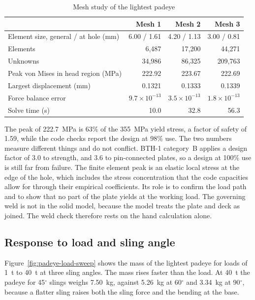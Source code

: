 \begin{table}[H]
\centering
\caption{Mesh study of the lightest padeye}
\label{tab:padeye-fea}
\small
\begin{tabular}{lrrr}
\toprule
& \textbf{Mesh 1} & \textbf{Mesh 2} & \textbf{Mesh 3}\\
\midrule
Element size, general / at hole (mm) & 6.00 / 1.61 & 4.20 / 1.13 & 3.00 / 0.81\\
Elements & 6,487 & 17,200 & 44,271\\
Unknowns & 34,986 & 86,325 & 209,763\\
Peak von Mises in head region (MPa) & 222.92 & 223.67 & 222.69\\
Largest displacement (mm) & 0.1321 & 0.1333 & 0.1339\\
Force balance error & $9.7\times10^{-13}$ & $3.5\times10^{-13}$ & $1.8\times10^{-13}$\\
Solve time (s) & 10.0 & 32.8 & 56.3\\
\bottomrule
\end{tabular}
\end{table}

The peak of 222.7~MPa is 63\% of the 355~MPa yield stress, a factor of safety
of 1.59, while the code checks report the design at 98\% use. The two numbers
measure different things and do not conflict. BTH-1 category~B applies a
design factor of 3.0 to strength, and 3.6 to pin-connected plates, so a
design at 100\% use is still far from failure. The finite element peak is an
elastic local stress at the edge of the hole, which includes the stress
concentration that the code capacities allow for through their empirical
coefficients. Its role is to confirm the load path and to show that no part of
the plate yields at the working load. The governing weld is not in the solid
model, because the model treats the plate and deck as joined. The weld check
therefore rests on the hand calculation alone.

\subsection{Response to load and sling angle}

Figure~\ref{fig:padeye-load-sweep} shows the mass of the lightest padeye for
loads of 1~t to 40~t at three sling angles. The mass rises faster than the
load. At 40~t the padeye for 45$^\circ$ slings weighs 7.50~kg, against 5.26~kg
at 60$^\circ$ and 3.34~kg at 90$^\circ$, because a flatter sling raises both
the sling force and the bending at the base.

